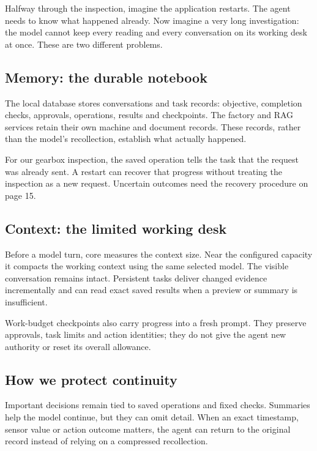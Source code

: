 Halfway through the inspection, imagine the application restarts. The agent needs to know what happened already. Now imagine a very long investigation: the model cannot keep every reading and every conversation on its working desk at once. These are two different problems.


\subsection*{Memory: the durable notebook}
The local database stores conversations and task records: objective, completion checks, approvals, operations, results and checkpoints. The factory and RAG services retain their own machine and document records. These records, rather than the model's recollection, establish what actually happened.

For our gearbox inspection, the saved operation tells the task that the request was already sent. A restart can recover that progress without treating the inspection as a new request. Uncertain outcomes need the recovery procedure on page 15.

\subsection*{Context: the limited working desk}
Before a model turn, core measures the context size. Near the configured capacity it compacts the working context using the same selected model. The visible conversation remains intact. Persistent tasks deliver changed evidence incrementally and can read exact saved results when a preview or summary is insufficient.

Work-budget checkpoints also carry progress into a fresh prompt. They preserve approvals, task limits and action identities; they do not give the agent new authority or reset its overall allowance.

\subsection*{How we protect continuity}
Important decisions remain tied to saved operations and fixed checks. Summaries help the model continue, but they can omit detail. When an exact timestamp, sensor value or action outcome matters, the agent can return to the original record instead of relying on a compressed recollection.

